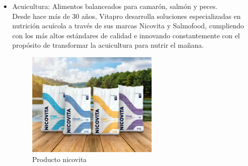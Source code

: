 \begin{itemize}
\item Acuicultura: Alimentos balanceados para camarón, salmón y peces. \\
Desde hace más de 30 años, Vitapro desarrolla soluciones especializadas en nutrición acuícola a través de sus marcas Nicovita y Salmofood, cumpliendo con los más altos estándares de calidad e innovando constantemente con el propósito de transformar la acuicultura para nutrir el mañana.
\\
\begin{figure}[!ht]
    \centering
    \includegraphics[width=0.6\textwidth]{./figuras/producto_nicovita.png}
    \caption{Producto nicovita}
\end{figure}

\end{itemize}
